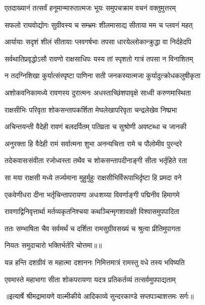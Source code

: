 \twolineshloka
{एतदाख्यानं तत्सर्वं हनूमान्मारुतात्मजः}
{भूयः समुपचक्राम वचनं वक्तुमुत्तरम्} %

\twolineshloka
{सफलो राघवोद्योगः सुग्रीवस्य च सम्भ्रमः}
{शीलमासाद्य सीताया मम च प्लवनं महत्} %

\twolineshloka
{आर्यायाः सदृशं शीलं सीतायाः प्लवगर्षभाः}
{तपसा धारयेल्लोकान्क्रुद्धा वा निर्दहेदपि} %

\twolineshloka
{सर्वथातिप्रवृद्धोऽसौ रावणो राक्षसाधिपः}
{यस्य तां स्पृशतो गात्रं तपसा न विनाशितम्} %

\twolineshloka
{न तदग्निशिखा कुर्यात्संस्पृष्टा पाणिना सती}
{जनकस्यात्मजा कुर्यादुत्क्रोधकलुषीकृता} %

\twolineshloka
{अशोकवनिकामध्ये रावणस्य दुरात्मनः}
{अधस्ताच्छिंशपावृक्षे साध्वी करुणमास्थिता} %

\twolineshloka
{राक्षसीभिः परिवृता शोकसन्तापकर्शिता}
{मेघलेखापरिवृता चन्द्रलेखेव निष्प्रभा} %

\twolineshloka
{अचिन्तयन्ती वैदेही रावणं बलदर्पितम्}
{पतिव्रता च सुश्रोणी अवष्टब्धा च जानकी} %

\twolineshloka
{अनुरक्ता हि वैदेही रामं सर्वात्मना शुभा}
{अनन्यचित्ता रामे च पौलोमीव पुरन्दरे} %

\twolineshloka
{तदेकवासःसंवीता रजोध्वस्ता तथैव च}
{शोकसन्तापदीनाङ्गी सीता भर्तृहिते रता} %

\twolineshloka
{सा मया राक्षसी मध्ये तर्ज्यमाना मुहुर्मुहुः}
{राक्षसीभिर्विरूपाभिर्दृष्टा हि प्रमदा वने} %

\twolineshloka
{एकवेणीधरा दीना भर्तृचिन्तापरायणा}
{अधःशय्या विवर्णाङ्गी पद्मिनीव हिमागमे} %

\twolineshloka
{रावणाद्विनिवृत्तार्था मर्तव्यकृतनिश्चया}
{कथञ्चिन्मृगशावाक्षी विश्वासमुपपादिता} %

\twolineshloka
{ततः सम्भाषिता चैव सर्वमर्थं च दर्शिता}
{रामसुग्रीवसख्यं च श्रुत्वा प्रीतिमुपागता} %

{नियतः समुदाचारो भक्तिर्भर्तरि चोत्तमा॥॥} %

\addtocounter{shlokacount}{1}

\twolineshloka
{यन्न हन्ति दशग्रीवं स महात्मा दशाननः}
{निमित्तमात्रं रामस्तु वधे तस्य भविष्यति} %

\twolineshloka
{एवमास्ते महाभागा सीता शोकपरायणा}
{यदत्र प्रतिकर्तव्यं तत्सर्वमुपपाद्यताम्} %


{॥इत्यार्षे श्रीमद्रामायणे वाल्मीकीये आदिकाव्ये सुन्दरकाण्डे सप्तपञ्चाशत्तमः सर्गः॥}


